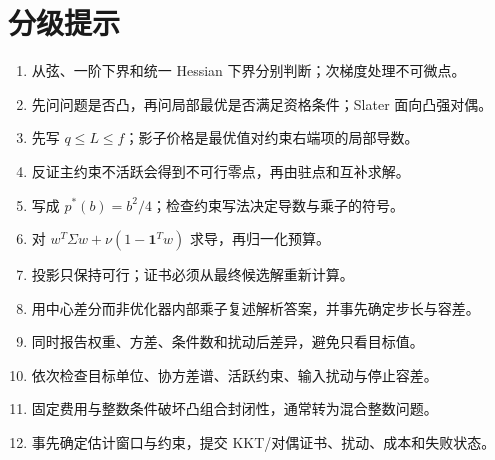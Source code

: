 \section*{分级提示}
\begingroup\small
\begin{enumerate}[nosep,leftmargin=*]
\item 从弦、一阶下界和统一 Hessian 下界分别判断；次梯度处理不可微点。
\item 先问问题是否凸，再问局部最优是否满足资格条件；Slater 面向凸强对偶。
\item 先写 $q\le L\le f$；影子价格是最优值对约束右端项的局部导数。
\item 反证主约束不活跃会得到不可行零点，再由驻点和互补求解。
\item 写成 $p^*(b)=b^2/4$；检查约束写法决定导数与乘子的符号。
\item 对 $w^T\Sigma w+\nu(1-\mathbf1^Tw)$ 求导，再归一化预算。
\item 投影只保持可行；证书必须从最终候选解重新计算。
\item 用中心差分而非优化器内部乘子复述解析答案，并事先确定步长与容差。
\item 同时报告权重、方差、条件数和扰动后差异，避免只看目标值。
\item 依次检查目标单位、协方差谱、活跃约束、输入扰动与停止容差。
\item 固定费用与整数条件破坏凸组合封闭性，通常转为混合整数问题。
\item 事先确定估计窗口与约束，提交 KKT/对偶证书、扰动、成本和失败状态。
\end{enumerate}
\endgroup


\MFQMappedUpperThirteenHints
